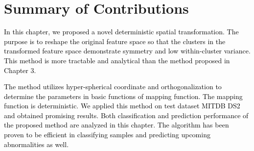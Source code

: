 \section{Summary of Contributions}

\textcolor{black}{In this chapter, we proposed a novel deterministic spatial transformation. The purpose is to reshape the original feature space so that the clusters in the transformed feature space demonstrate symmetry and low within-cluster variance. This method is more tractable and analytical than the method proposed in Chapter 3.}

\textcolor{black}{The method utilizes hyper-spherical coordinate and orthogonalization to determine the parameters in basic functions of mapping function. The mapping function is deterministic. We applied this method on test dataset MITDB DS2 and obtained promising results. Both classification and prediction performance of the proposed method are analyzed in this chapter. The algorithm has been proven to be efficient in classifying samples and predicting upcoming abnormalities as well. }

